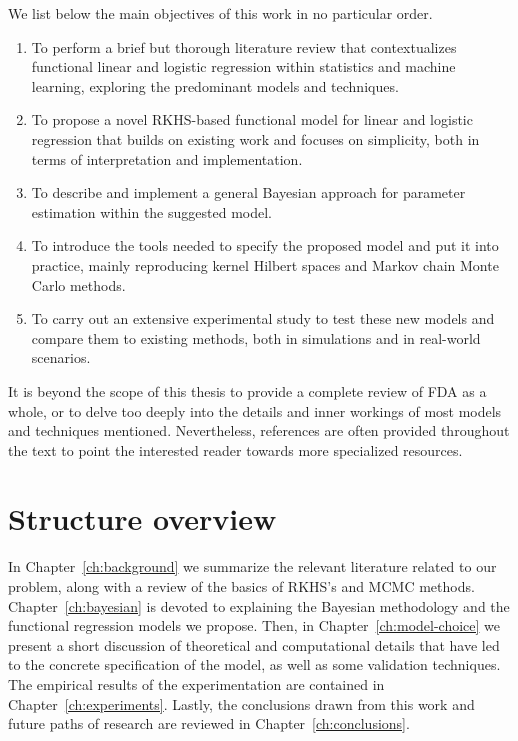 We list below the main objectives of this work in no particular order.

\begin{enumerate}[1.]
  \item To perform a brief but thorough literature review that contextualizes functional linear and logistic regression within statistics and machine learning, exploring the predominant models and techniques.
  \item To propose a novel RKHS-based functional model for linear and logistic regression that builds on existing work and focuses on simplicity, both in terms of interpretation and implementation.
  \item To describe and implement a general Bayesian approach for parameter estimation within the suggested model.
  \item To introduce the tools needed to specify the proposed model and put it into practice, mainly reproducing kernel Hilbert spaces and Markov chain Monte Carlo methods.
  \item To carry out an extensive experimental study to test these new models and compare them to existing methods, both in simulations and in real-world scenarios.
\end{enumerate}

It is beyond the scope of this thesis to provide a complete review of FDA as a whole, or to delve too deeply into the details and inner workings of most models and techniques mentioned. Nevertheless, references are often provided throughout the text to point the interested reader towards more specialized resources.


\section{Structure overview}

In Chapter~\ref{ch:background} we summarize the relevant literature related to our problem, along with a review of the basics of RKHS's and MCMC methods. Chapter~\ref{ch:bayesian} is devoted to explaining the Bayesian methodology and the functional regression models we propose. Then, in Chapter~\ref{ch:model-choice} we present a short discussion of theoretical and computational details that have led to the concrete specification of the model, as well as some validation techniques. The empirical results of the experimentation are contained in Chapter~\ref{ch:experiments}. Lastly, the conclusions drawn from this work and future paths of research are reviewed in Chapter~\ref{ch:conclusions}.
